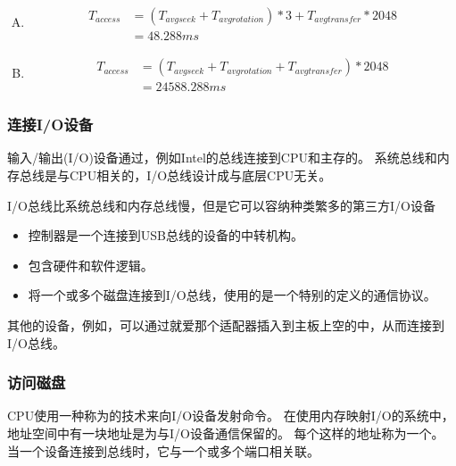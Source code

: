 {{{\begin{practicec}
                \begin{enumerate}[A.]
                    \item
                    {
                        \begin{align*}
                            T_{access} &= (T_{avg seek} + T_{avg rotation}) * 3 + T_{avg transfer} * 2048 \\
                            &= 48.288ms
                        \end{align*}
                    }
                    \item
                    {
                        \begin{align*}
                            T_{access} &= (T_{avg seek} + T_{avg rotation} + T_{avg transfer}) * 2048 \\
                            &= 24588.288ms
                        \end{align*}
                    }
                \end{enumerate}
            \end{practicec}
        }

        \subsubsection{连接I/O设备}
        {
            输入/输出(I/O)设备通过，例如Intel的总线连接到CPU和主存的。
            系统总线和内存总线是与CPU相关的，I/O总线设计成与底层CPU无关。

            I/O总线比系统总线和内存总线慢，但是它可以容纳种类繁多的第三方I/O设备

            \begin{itemize}
                \item {}控制器是一个连接到USB总线的设备的中转机构。
                \item {}包含硬件和软件逻辑。
                \item {}将一个或多个磁盘连接到I/O总线，使用的是一个特别的定义的通信协议。
            \end{itemize}

            其他的设备，例如，可以通过就爱那个适配器插入到主板上空的中，从而连接到I/O总线。
        }

        \subsubsection{访问磁盘}
        {
            CPU使用一种称为的技术来向I/O设备发射命令。
            在使用内存映射I/O的系统中，地址空间中有一块地址是为与I/O设备通信保留的。
            每个这样的地址称为一个。
            当一个设备连接到总线时，它与一个或多个端口相关联。

}}}
